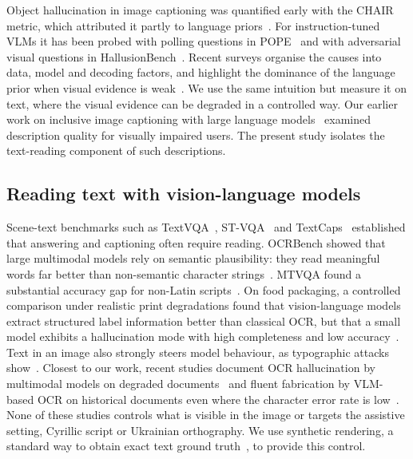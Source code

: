 \documentclass[pdflatex,sn-mathphys-num]{sn-jnl}%
\theoremstyle{thmstyleone}%
\theoremstyle{thmstyletwo}%
\theoremstyle{thmstylethree}%
\begin{document}
Object hallucination in image captioning was quantified early with the CHAIR metric, which attributed it partly to language priors~\cite{rohrbach2018object}. For instruction-tuned VLMs it has been probed with polling questions in POPE~\cite{li2023evaluating} and with adversarial visual questions in HallusionBench~\cite{guan2024hallusionbench}. Recent surveys organise the causes into data, model and decoding factors, and highlight the dominance of the language prior when visual evidence is weak~\cite{bai2024hallucination,liu2024survey}. We use the same intuition but measure it on text, where the visual evidence can be degraded in a controlled way. Our earlier work on inclusive image captioning with large language models~\cite{zatserkovnyi2025llm} examined description quality for visually impaired users. The present study isolates the text-reading component of such descriptions.

\subsection{Reading text with vision-language models}

Scene-text benchmarks such as TextVQA~\cite{singh2019towards}, ST-VQA~\cite{biten2019scene} and TextCaps~\cite{sidorov2020textcaps} established that answering and captioning often require reading. OCRBench showed that large multimodal models rely on semantic plausibility: they read meaningful words far better than non-semantic character strings~\cite{liu2024ocrbench}. MTVQA found a substantial accuracy gap for non-Latin scripts~\cite{tang2025mtvqa}. On food packaging, a controlled comparison under realistic print degradations found that vision-language models extract structured label information better than classical OCR, but that a small model exhibits a hallucination mode with high completeness and low accuracy~\cite{zatserkovna2026packaging}. Text in an image also strongly steers model behaviour, as typographic attacks show~\cite{cheng2024unveiling}. Closest to our work, recent studies document OCR hallucination by multimodal models on degraded documents~\cite{he2025seeing} and fluent fabrication by VLM-based OCR on historical documents even where the character error rate is low~\cite{gardella2026low}. None of these studies controls what is visible in the image or targets the assistive setting, Cyrillic script or Ukrainian orthography. We use synthetic rendering, a standard way to obtain exact text ground truth~\cite{jaderberg2016reading,gupta2016synthetic}, to provide this control.
\end{document}
